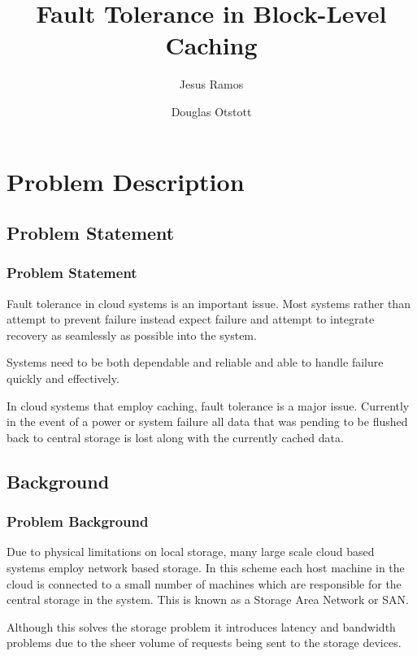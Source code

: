 \documentclass{beamer}
\title{Fault Tolerance in Block-Level Caching}
\author{
  Jesus Ramos \and
  Douglas Otstott
}
\institute[FIU]{Florida International University}
\date{}
\begin{document}
\maketitle

\section{Problem Description}

\subsection{Problem Statement}

\begin{frame}
  \frametitle{Problem Statement}

  Fault tolerance in cloud systems is an important issue. Most systems
  rather than attempt to prevent failure instead expect failure and
  attempt to integrate recovery as seamlessly as possible into the system.

  Systems need to be both dependable and reliable and able to handle
  failure quickly and effectively.

  In cloud systems that employ caching, fault tolerance is a major
  issue. Currently in the event of a power or system failure all data
  that was pending to be flushed back to central storage is lost along
  with the currently cached data.

\end{frame}


\subsection{Background}

\begin{frame}
  \frametitle{Problem Background}
  
  Due to physical limitations on local storage, many large scale cloud
  based systems employ network based storage. In this scheme each host
  machine in the cloud is connected to a small number of machines
  which are responsible for the central storage in the system. This is
  known as a Storage Area Network or SAN.

  Although this solves the storage problem it introduces latency and
  bandwidth problems due to the sheer volume of requests being sent to
  the storage devices.

\end{frame}
\end{document}
